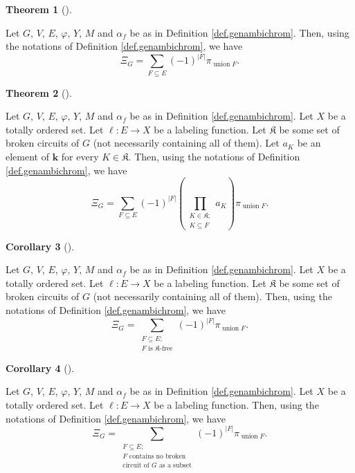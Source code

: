 \documentclass[numbers=enddot,12pt,final,onecolumn,notitlepage]{scrartcl}%
\theoremstyle{definition}
\newtheorem{theo}{Theorem}[section]
\newenvironment{theorem}[1][]
{\begin{theo}[#1]\begin{leftbar}}
{\end{leftbar}\end{theo}}
\newtheorem{coro}[theo]{Corollary}
\newenvironment{corollary}[1][]
{\begin{coro}[#1]\begin{leftbar}}
{\end{leftbar}\end{coro}}
\let\sumnonlimits\sum
\let\prodnonlimits\prod
\renewcommand{\sum}{\sumnonlimits\limits}
\renewcommand{\prod}{\prodnonlimits\limits}
\begin{document}
\begin{theorem}
\label{thm.genambichromsym.empty}Let $G$, $V$, $E$, $\varphi$, $Y$, $M$ and
$\alpha_{f}$ be as in Definition \ref{def.genambichrom}. Then, using the
notations of Definition \ref{def.genambichrom}, we have%
\[
\Xi_{G}=\sum_{F\subseteq E}\left(  -1\right)  ^{\left\vert F\right\vert }%
\pi_{\operatorname*{union}F}.
\]

\end{theorem}

\begin{theorem}
\label{thm.genambichromsym.varis}Let $G$, $V$, $E$, $\varphi$, $Y$, $M$ and
$\alpha_{f}$ be as in Definition \ref{def.genambichrom}. Let $X$ be a totally
ordered set. Let $\ell:E\rightarrow X$ be a labeling function. Let
$\mathfrak{K}$ be some set of broken circuits of $G$ (not necessarily
containing all of them). Let $a_{K}$ be an element of $\mathbf{k}$ for every
$K\in\mathfrak{K}$. Then, using the notations of Definition
\ref{def.genambichrom}, we have%
\[
\Xi_{G}=\sum_{F\subseteq E}\left(  -1\right)  ^{\left\vert F\right\vert
}\left(  \prod_{\substack{K\in\mathfrak{K};\\K\subseteq F}}a_{K}\right)
\pi_{\operatorname*{union}F}.
\]

\end{theorem}

\begin{corollary}
\label{cor.genambichromsym.K-free}Let $G$, $V$, $E$, $\varphi$, $Y$, $M$ and
$\alpha_{f}$ be as in Definition \ref{def.genambichrom}. Let $X$ be a totally
ordered set. Let $\ell:E\rightarrow X$ be a labeling function. Let
$\mathfrak{K}$ be some set of broken circuits of $G$ (not necessarily
containing all of them). Then, using the notations of Definition
\ref{def.genambichrom}, we have%
\[
\Xi_{G}=\sum_{\substack{F\subseteq E;\\F\text{ is }\mathfrak{K}\text{-free}%
}}\left(  -1\right)  ^{\left\vert F\right\vert }\pi_{\operatorname*{union}F}.
\]

\end{corollary}

\begin{corollary}
\label{cor.genambichromsym.NBC}Let $G$, $V$, $E$, $\varphi$, $Y$, $M$ and
$\alpha_{f}$ be as in Definition \ref{def.genambichrom}. Let $X$ be a totally
ordered set. Let $\ell:E\rightarrow X$ be a labeling function. Then, using the
notations of Definition \ref{def.genambichrom}, we have%
\[
\Xi_{G}=\sum_{\substack{F\subseteq E;\\F\text{ contains no broken}%
\\\text{circuit of }G\text{ as a subset}}}\left(  -1\right)  ^{\left\vert
F\right\vert }\pi_{\operatorname*{union}F}.
\]

\end{corollary}
\end{document}
